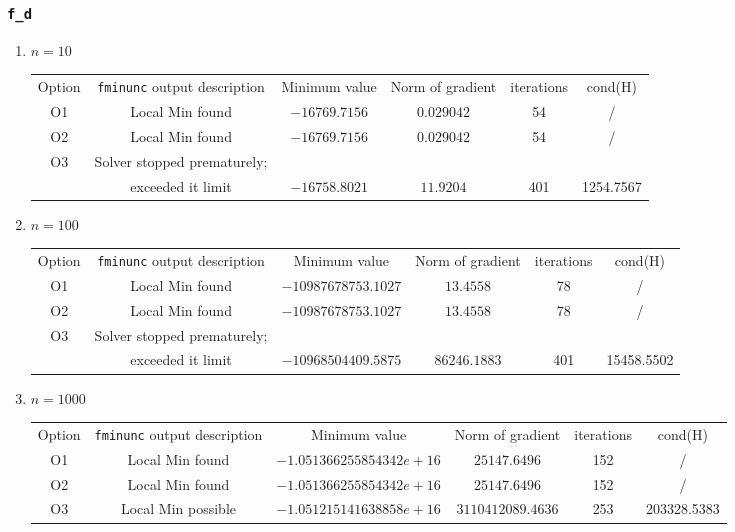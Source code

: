 \documentclass{article}
\begin{document}
    \subsubsection{\texttt{f\_d}}
    \begin{enumerate}
        \item $n=10$
        \begin{center}
        \begin{tabular}{c|c|c|c|c|c}
        \hline
        Option&\texttt{fminunc} output description&Minimum value&Norm of gradient&iterations&cond(H)\\
        O1&Local Min found&$-16769.7156$&$0.029042$&54&/\\
        O2&Local Min found&$-16769.7156$&$0.029042$&54&/\\
        O3&Solver stopped prematurely;&\\ &exceeded it limit&$-16758.8021$&$11.9204$&401&1254.7567\\
        \hline
        \end{tabular}
        \end{center}

        \item $n=100$
        \begin{center}
        \begin{tabular}{c|c|c|c|c|c}
        \hline
        Option&\texttt{fminunc} output description&Minimum value&Norm of gradient&iterations&cond(H)\\
        O1&Local Min found&$-10987678753.1027$&$13.4558$&78&/\\
        O2&Local Min found&$-10987678753.1027$&$13.4558$&78&/\\
        O3&Solver stopped prematurely;&\\ &exceeded it limit&$-10968504409.5875$&$ 86246.1883$&401&15458.5502\\
        \hline
        \end{tabular}
        \end{center}

         \item $n=1000$
        \begin{center}
        \begin{tabular}{c|c|c|c|c|c}
        \hline
        Option&\texttt{fminunc} output description&Minimum value&Norm of gradient&iterations&cond(H)\\
        O1&Local Min found&$-1.051366255854342e+16$&$25147.6496$&152&/\\
        O2&Local Min found&$-1.051366255854342e+16$&$25147.6496$&152&/\\
         O3&Local Min possible&$-1.051215141638858e+16$&$3110412089.4636$&253&203328.5383\\
        \hline
        \end{tabular}
        \end{center}
    \end{enumerate}
\end{document}
